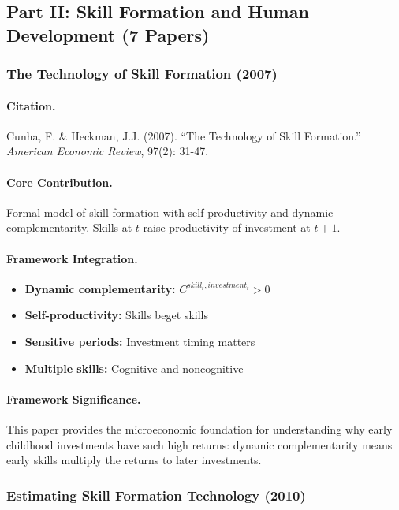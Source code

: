 \subsection{Part II: Skill Formation and Human Development (7 Papers)}

\subsubsection{The Technology of Skill Formation (2007)}

\paragraph{Citation.}
Cunha, F. \& Heckman, J.J. (2007). ``The Technology of Skill Formation.''
\emph{American Economic Review}, 97(2): 31-47.

\paragraph{Core Contribution.}
Formal model of skill formation with self-productivity and dynamic
complementarity. Skills at $t$ raise productivity of investment at $t+1$.

\paragraph{Framework Integration.}
\begin{itemize}
  \item \textbf{Dynamic complementarity:} $C^{skill_t, investment_t} > 0$
  \item \textbf{Self-productivity:} Skills beget skills
  \item \textbf{Sensitive periods:} Investment timing matters
  \item \textbf{Multiple skills:} Cognitive and noncognitive
\end{itemize}

\paragraph{Framework Significance.}
This paper provides the microeconomic foundation for understanding why
early childhood investments have such high returns: dynamic complementarity
means early skills multiply the returns to later investments.

\subsubsection{Estimating Skill Formation Technology (2010)}

